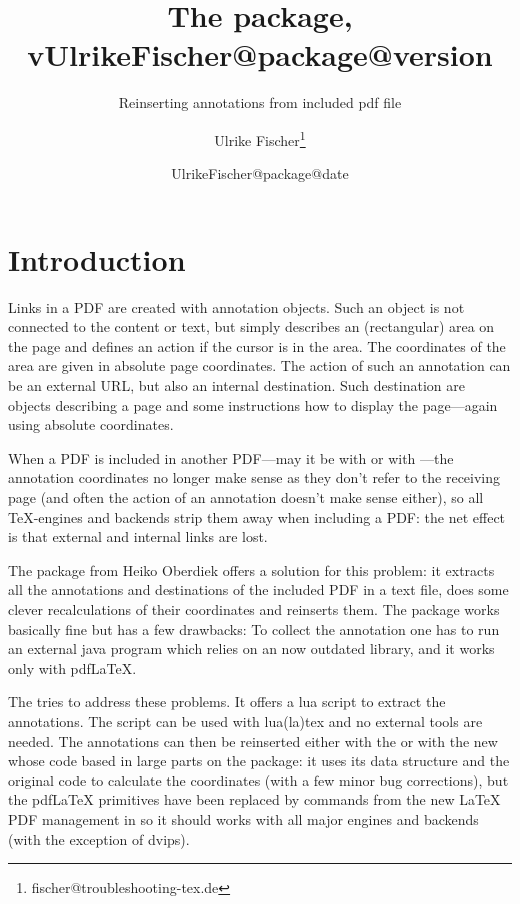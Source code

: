 \documentclass[DIV=12,parskip=half-,bibliography=totoc]{scrartcl}
\title{The \pkg{newpax} package, v\csname UlrikeFischer@package@version\endcsname}
\subtitle{Reinserting annotations from included pdf file}
\date{\csname UlrikeFischer@package@date\endcsname}
\author{Ulrike Fischer\thanks{fischer@troubleshooting-tex.de}}
\begin{document}
\maketitle

\section{Introduction}

Links in a PDF are created with annotation objects. Such an object is not connected to the content
or text, but simply describes an (rectangular) area on the page and defines an action if the
cursor is in the area. The coordinates of the area are given in absolute page coordinates.
The action of such an annotation can be an external URL, but also an internal destination.
Such destination are objects describing a page and some instructions how to display the page---again using absolute coordinates.

When a PDF is included in another PDF---may it be with  or with \hspace{0pt}---\hspace{0pt}the annotation coordinates no longer make sense as they don't refer to the receiving page (and often the action of an annotation doesn't make sense either), so all TeX-engines and backends strip them away when including a PDF: the net effect is that external and internal links are lost.

The  package from Heiko Oberdiek offers a solution for this problem: it extracts all the annotations
and destinations of the included PDF in a text file, does some clever recalculations of their coordinates and reinserts them.
The package works basically fine but has a few drawbacks: To collect the annotation one has to run an external
java program which relies on an now outdated library, and it works only with pdf\LaTeX{}.

The  tries to address these problems. It offers a lua script to extract the annotations.
The script can be used with lua(la)tex  and no external tools are needed. The annotations can
then be reinserted either with the  or with the new  whose code based in large parts on the  package: it uses its data structure and the original code to calculate the coordinates (with a few minor bug corrections), but the pdf\LaTeX{} primitives have been replaced by commands from the new \LaTeX{} PDF management in  so it should works with all major engines and backends (with the exception of dvips).
\end{document}
